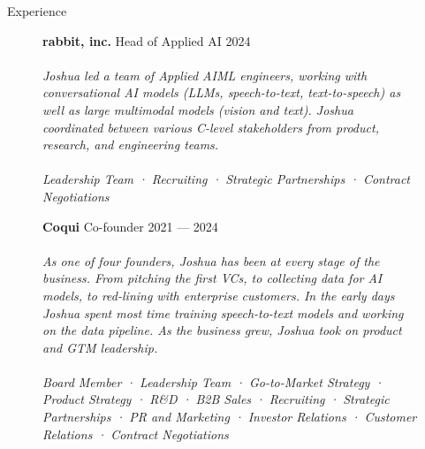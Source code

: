 \documentclass{cv} %
\begin{document}
\begin{rSection}{Experience}

  \begin{figure}[H]
    \begin{minipage}{0.2\textwidth}
      \centering
        
      \end{minipage}
      \begin{minipage}{0.8\textwidth}
          {\bf rabbit, inc.} \hfill  Head of Applied AI \hspace{0.5cm} {2024} \\ \\
          \textit{Joshua led a team of Applied AIML engineers, working with conversational AI models (LLMs, speech-to-text, text-to-speech) as well as large multimodal models (vision and text). Joshua coordinated between various C-level stakeholders from product, research, and engineering teams.} \\ \\
          \textit{Leadership Team · Recruiting · Strategic Partnerships · Contract Negotiations} \\
      \end{minipage}
  \end{figure}

  \begin{figure}[H]
    \begin{minipage}{0.2\textwidth}
      \centering
        
      \end{minipage}
      \begin{minipage}{0.8\textwidth}
          {\bf Coqui} \hfill  Co-founder \hspace{0.5cm} {2021 --- 2024} \\ \\
          \textit{As one of four founders, Joshua has been at every stage of the business. From pitching the first VCs, to collecting data for AI models, to red-lining with enterprise customers. In the early days Joshua spent most time training speech-to-text models and working on the data pipeline. As the business grew, Joshua took on product and GTM leadership.} \\ \\
          \textit{Board Member · Leadership Team · Go-to-Market Strategy · Product Strategy · R\&D · B2B Sales · Recruiting · Strategic Partnerships · PR and Marketing · Investor Relations · Customer Relations · Contract Negotiations} \\
      \end{minipage}
  \end{figure}


\end{rSection}
\end{document}
